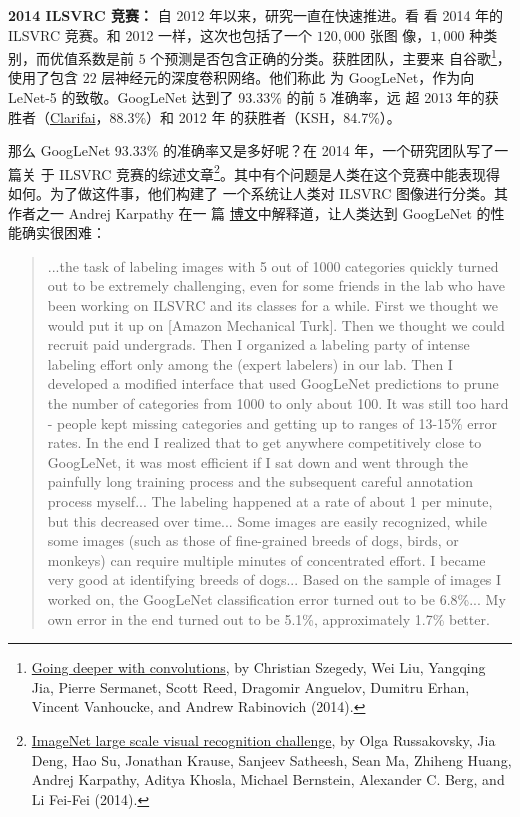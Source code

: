 \textbf{2014 ILSVRC 竞赛：} 自 2012 年以来，研究一直在快速推进。看
看 2014 年的 ILSVRC 竞赛。和 2012 一样，这次也包括了一个 $120,000$ 张图
像，$1,000$ 种类别，而优值系数是前 $5$ 个预测是否包含正确的分类。获胜团队，主要来
自谷歌\footnote{\href{http://arxiv.org/abs/1409.4842}{Going deeper with
    convolutions}, by Christian Szegedy, Wei Liu, Yangqing Jia, Pierre Sermanet,
  Scott Reed, Dragomir Anguelov, Dumitru Erhan, Vincent Vanhoucke, and Andrew
  Rabinovich (2014).}，使用了包含 $22$ 层神经元的深度卷积网络。他们称此
为 GoogLeNet，作为向 LeNet-5 的致敬。GoogLeNet 达到了 93.33\% 的前 $5$ 准确率，远
超 2013 年的获胜者（\href{http://www.clarifai.com/}{Clarifai}，88.3\%）和 2012 年
的获胜者（KSH，84.7\%）。

那么 GoogLeNet 93.33\% 的准确率又是多好呢？在 2014 年，一个研究团队写了一篇关
于 ILSVRC 竞赛的综述文章\footnote{\href{http://arxiv.org/abs/1409.0575}{ImageNet
    large scale visual recognition challenge}, by Olga Russakovsky, Jia Deng,
  Hao Su, Jonathan Krause, Sanjeev Satheesh, Sean Ma, Zhiheng Huang, Andrej
  Karpathy, Aditya Khosla, Michael Bernstein, Alexander C. Berg, and Li Fei-Fei
  (2014).}。其中有个问题是人类在这个竞赛中能表现得如何。为了做这件事，他们构建了
一个系统让人类对 ILSVRC 图像进行分类。其作者之一 Andrej Karpathy 在一
篇%
\href{http://karpathy.github.io/2014/09/02/what-i-learned-from-competing-against-a-convnet-on-imagenet/}{%
  博文}中解释道，让人类达到 GoogLeNet 的性能确实很困难：

\begin{quote}
  ...the task of labeling images with 5 out of 1000 categories quickly turned
  out to be extremely challenging, even for some friends in the lab who have
  been working on ILSVRC and its classes for a while. First we thought we would
  put it up on [Amazon Mechanical Turk]. Then we thought we could recruit paid
  undergrads. Then I organized a labeling party of intense labeling effort only
  among the (expert labelers) in our lab. Then I developed a modified interface
  that used GoogLeNet predictions to prune the number of categories from 1000 to
  only about 100. It was still too hard - people kept missing categories and
  getting up to ranges of 13-15\% error rates. In the end I realized that to get
  anywhere competitively close to GoogLeNet, it was most efficient if I sat down
  and went through the painfully long training process and the subsequent
  careful annotation process myself... The labeling happened at a rate of about
  1 per minute, but this decreased over time... Some images are easily
  recognized, while some images (such as those of fine-grained breeds of dogs,
  birds, or monkeys) can require multiple minutes of concentrated effort. I
  became very good at identifying breeds of dogs... Based on the sample of
  images I worked on, the GoogLeNet classification error turned out to be
  6.8\%... My own error in the end turned out to be 5.1\%, approximately 1.7\%
  better.
\end{quote}


